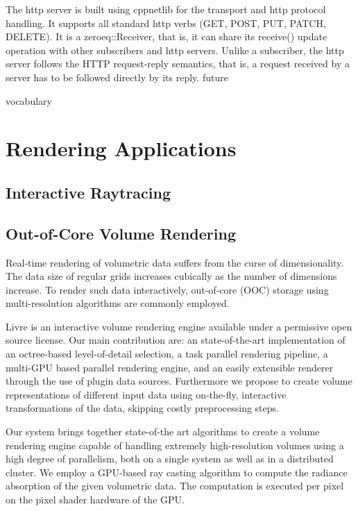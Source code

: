 \documentclass[10pt]{llncs}
\begin{document}
The http server is built using cppnetlib \cite{cppnetlib} for the transport and
http protocol handling. It supports all standard http verbs (GET, POST, PUT,
PATCH, DELETE). It is a \textsf{zeroeq::Receiver}, that is, it can share its
\textsf{receive()} update operation with other subscribers and http servers.
Unlike a subscriber, the http server follows the HTTP request-reply semantics,
that is, a request received by a server has to be followed directly by its
reply. future


vocabulary

\section{Rendering Applications}
\subsection{Interactive Raytracing}

\subsection{Out-of-Core Volume Rendering}

Real-time rendering of volumetric data suffers from the curse of
dimensionality. The data size of regular grids increases cubically as the number
of dimensions increase. To render such data interactively, out-of-core (OOC)
storage using multi-resolution algorithms are commonly employed.

Livre is an interactive volume rendering engine available under a permissive
open source license. Our main contribution are: an state-of-the-art
implementation of an octree-based level-of-detail selection, a task parallel
rendering pipeline, a multi-GPU based parallel rendering engine, and an easily
extensible renderer through the use of plugin data sources. Furthermore we
propose to create volume representations of different input data using
on-the-fly, interactive transformations of the data, skipping costly
preprocessing steps.

Our system brings together state-of-the art algorithms to create a volume
rendering engine capable of handling extremely high-resolution volumes using a
high degree of parallelism, both on a single system as well as in a distributed
cluster. We employ a GPU-based ray casting algorithm to compute the radiance
absorption of the given volumetric data. The computation is executed per pixel
on the pixel shader hardware of the GPU.
\end{document}
